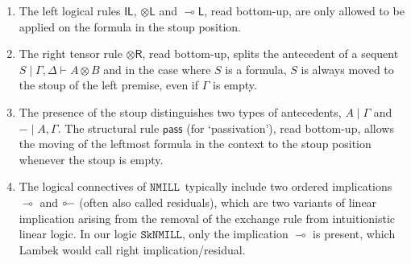 \documentclass[sn-mathphys-num]{sn-jnl}%
\newcommand{\GG}{\Gamma}
\newcommand{\GD}{\Delta}
\newcommand{\vd}{\vdash}
\newcommand{\tl}{\otimes \mathsf{L}}
\newcommand{\tr}{\otimes\mathsf{R}}
\newcommand{\pass}{\mathsf{pass}}
\newcommand{\unitl}{\mathsf{IL}}
\newcommand{\ot}{\otimes}
\newcommand{\lolli}{\multimap}
\newcommand{\lleft}{{\lolli}\mathsf{L}}
\newcommand{\illol}{\rotatebox[origin=c]{180}{$\multimap$}}
\newcommand{\unit}{\mathsf{I}}
\newcommand{\NMILL}{$\mathtt{NMILL}$}
\newcommand{\SkNMILL}{$\mathtt{SkNMILL}$}
\newcommand{\niccolo}[1]{\textcolor{red}{NV: #1}}
\theoremstyle{thmstyleone}%
\theoremstyle{thmstyletwo}%
\theoremstyle{thmstylethree}%
\begin{document}
\begin{enumerate}
  \item The left logical rules $\unitl$, $\tl$ and $\lleft$, read bottom-up, are only allowed to be applied on the formula in the stoup position.
  \item The right tensor rule $\tr$, read bottom-up, splits the antecedent of a sequent $S \mid \GG, \GD \vd A \ot B$ and in the case where $S$ is a formula, $S$ is always moved to the stoup of the left premise, even if $\GG$ is empty.
  \item The presence of the stoup distinguishes two types of antecedents, $A \mid \GG$ and ${-} \mid A, \GG$. The structural rule $\pass$ (for `passivation'), read bottom-up, allows the moving of the leftmost formula in the context to the stoup position whenever the stoup is empty.
  \item The logical connectives of \NMILL~typically include two ordered implications $\lolli$ and $\illol$ (often also called residuals), which are two variants of linear implication arising from the removal of the exchange rule from intuitionistic linear logic. In our logic \SkNMILL, only the implication $\lolli$ is present, which Lambek would call right implication/residual.
\end{enumerate}
\end{document}
